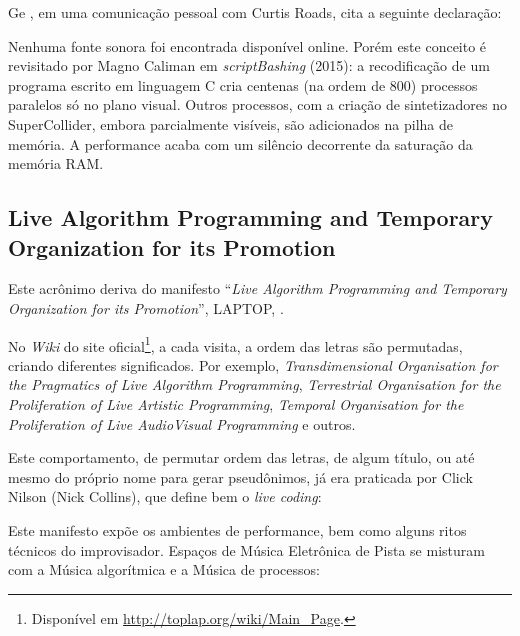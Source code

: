 Ge , em uma comunicação pessoal com Curtis Roads, cita a seguinte declaração: 

Nenhuma fonte sonora foi encontrada disponível online. Porém este conceito é revisitado por Magno Caliman em \emph{scriptBashing} (2015): a recodificação de um programa escrito em linguagem C cria centenas (na ordem de 800) processos paralelos só no plano visual. Outros processos, com a criação de sintetizadores no SuperCollider, embora parcialmente visíveis, são adicionados na pilha de memória. A performance acaba com um silêncio decorrente da saturação da memória RAM.


\subsection{Live Algorithm Programming and Temporary Organization for its Promotion}\label{sec:laptoptoplap}

Este acrônimo deriva  do manifesto ``\emph{Live Algorithm Programming and Temporary Organization for its Promotion}'', LAPTOP, \cite{ward_live_2004,blackwell_programming_2005}.

No \emph{Wiki} do site oficial\footnote{Disponível em \url{http://toplap.org/wiki/Main_Page}.}, a cada visita, a ordem das letras são permutadas, criando diferentes significados. Por exemplo, \emph{Transdimensional Organisation for the Pragmatics of Live Algorithm Programming}, \emph{Terrestrial Organisation for the Proliferation of Live Artistic Programming}, \emph{Temporal Organisation for the Proliferation of Live AudioVisual Programming} e outros. 

Este comportamento, de permutar ordem das letras, de algum título, ou até mesmo do próprio nome para gerar pseudônimos, já era praticada por Click Nilson (Nick Collins), que define bem o \emph{live coding}: 

Este manifesto expõe os ambientes de performance, bem como alguns ritos técnicos do improvisador. Espaços de Música Eletrônica de Pista se misturam com a Música algorítmica e a Música de processos:

